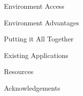 \documentclass[14pt]{beamer}
\newcommand{\toptitle}[1]{
  {\huge #1} \\
  \vspace{0.2cm}
}
\begin{document}
\begin{frame}
  \toptitle{Environment Access}
\end{frame}

\begin{frame}
  \toptitle{Environment Advantages}
\end{frame}

\begin{frame}
  \toptitle{Putting it All Together}
\end{frame}

\begin{frame}
  \toptitle{Existing Applications}
\end{frame}

\begin{frame}
  \toptitle{Resources}
\end{frame}

\begin{frame}
  \toptitle{Acknowledgements}
\end{frame}
\end{document}
